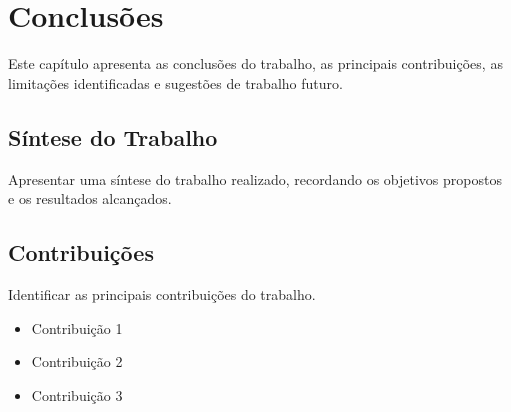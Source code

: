 %


\chapter{Conclusões}
\label{cap:conclusoes}

Este capítulo apresenta as conclusões do trabalho, as principais contribuições, as limitações identificadas e sugestões de trabalho futuro.

\section{Síntese do Trabalho}
\label{sec:sintese}

Apresentar uma síntese do trabalho realizado, recordando os objetivos propostos e os resultados alcançados.

\section{Contribuições}
\label{sec:contribuicoes}

Identificar as principais contribuições do trabalho.

\begin{itemize}
    \item Contribuição 1
    \item Contribuição 2
    \item Contribuição 3
\end{itemize}

